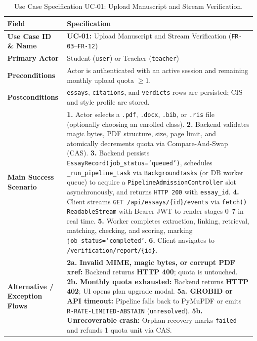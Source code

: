 \begin{table}[!htbp]
\centering
\caption{Use Case Specification UC-01: Upload Manuscript and Stream Verification.}\label{tab:uc01}
\begin{tabular}{|L{0.24}|L{0.76}|}
\hline
\textbf{Field} & \textbf{Specification} \\
\hline
\textbf{Use Case ID \& Name} & \textbf{UC-01:} Upload Manuscript and Stream Verification (\texttt{FR-03}--\texttt{FR-12}) \\
\hline
\textbf{Primary Actor} & Student (\texttt{user}) or Teacher (\texttt{teacher}) \\
\hline
\textbf{Preconditions} & Actor is authenticated with an active session and remaining monthly upload quota $\ge 1$. \\
\hline
\textbf{Postconditions} & \texttt{essays}, \texttt{citations}, and \texttt{verdicts} rows are persisted; CIS and style profile are stored. \\
\hline
\textbf{Main Success Scenario} & \textbf{1.} Actor selects a \texttt{.pdf}, \texttt{.docx}, \texttt{.bib}, or \texttt{.ris} file (optionally choosing an enrolled class). \newline \textbf{2.} Backend validates magic bytes, PDF structure, size, page limit, and atomically decrements quota via Compare-And-Swap (CAS). \newline \textbf{3.} Backend persists \texttt{EssayRecord(job\_status='queued')}, schedules \texttt{\_run\_pipeline\_task} via \texttt{BackgroundTasks} (or DB worker queue) to acquire a \texttt{PipelineAdmissionController} slot asynchronously, and returns \texttt{HTTP 200} with \texttt{essay\_id}. \newline \textbf{4.} Client streams \texttt{GET /api/essays/\{id\}/events} via \texttt{fetch()} \texttt{ReadableStream} with Bearer JWT to render stages 0--7 in real time. \newline \textbf{5.} Worker completes extraction, linking, retrieval, matching, checking, and scoring, marking \texttt{job\_status='completed'}. \newline \textbf{6.} Client navigates to \texttt{/verification/report/\{id\}}. \\
\hline
\textbf{Alternative / Exception Flows} & \textbf{2a. Invalid MIME, magic bytes, or corrupt PDF xref:} Backend returns \textbf{HTTP 400}; quota is untouched. \newline \textbf{2b. Monthly quota exhausted:} Backend returns \textbf{HTTP 402}; UI opens plan upgrade modal. \newline \textbf{5a. GROBID or API timeout:} Pipeline falls back to PyMuPDF or emits \texttt{R-RATE-LIMITED-ABSTAIN} (\texttt{unresolved}). \newline \textbf{5b. Unrecoverable crash:} Orphan recovery marks \texttt{failed} and refunds 1 quota unit via CAS. \\
\hline
\end{tabular}
\end{table}

